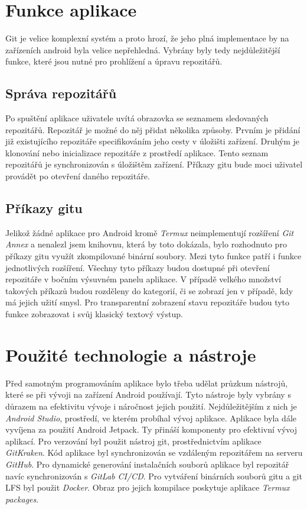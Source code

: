 \section{Funkce aplikace}
Git je velice komplexní systém a proto hrozí, že jeho plná implementace by na zařízeních android byla velice nepřehledná. Vybrány byly tedy nejdůležitější funkce, které jsou nutné pro prohlížení a úpravu repozitářů. 

    \subsection{Správa repozitářů}
    Po spuštění aplikace uživatele uvítá obrazovka se seznamem sledovaných repozitářů. Repozitář je možné do něj přidat několika způsoby. Prvním je přidání již existujícího repozitáře specifikováním jeho cesty v úložišti zařízení. Druhým je klonování nebo inicializace repozitáře z prostředí aplikace. Tento seznam repozitářů je synchronizován s úložištěm zařízení. Příkazy gitu bude moci uživatel provádět po otevření daného repozitáře.

    \subsection{Příkazy gitu}
    Jelikož žádné aplikace pro Android kromě \emph{Termux} neimplementují rozšíření \emph{Git Annex} a nenalezl jsem knihovnu, která by toto dokázala, bylo rozhodnuto pro příkazy gitu využít zkompilované binární soubory. Mezi tyto funkce patří i funkce jednotlivých rozšíření. Všechny tyto příkazy budou dostupné při otevření repozitáře v bočním výsuvném panelu aplikace. V případě velkého množství takových příkazů budou rozděleny do kategorií, či se zobrazí jen v případě, kdy má jejich užití smysl. Pro transparentní zobrazení stavu repozitáře budou tyto funkce zobrazovat i svůj klasický textový výstup.

\section{Použité technologie a nástroje}
Před samotným programováním aplikace bylo třeba udělat průzkum nástrojů, které se při vývoji na zařízení Android používají. Tyto nástroje byly vybrány s důrazem na efektivitu vývoje i náročnost jejich použití. Nejdůležitějším z nich je \emph{Android Studio}, prostředí, ve kterém probíhal vývoj aplikace. Aplikace byla dále vyvíjena za použití Android Jetpack. Ty přináší komponenty pro efektivní vývoj aplikací. Pro verzování byl použit nástroj git, prostřednictvím aplikace \emph{GitKraken}. Kód aplikace byl synchronizován se vzdáleným repozitářem na serveru \emph{GitHub}. Pro dynamické generování instalačních souborů aplikace byl repozitář navíc synchronizován s \emph{GitLab CI/CD}. Pro vytváření binárních souborů gitu a git LFS byl použit \emph{Docker}. Obraz pro jejich kompilace poskytuje aplikace \emph{Termux packages}.

